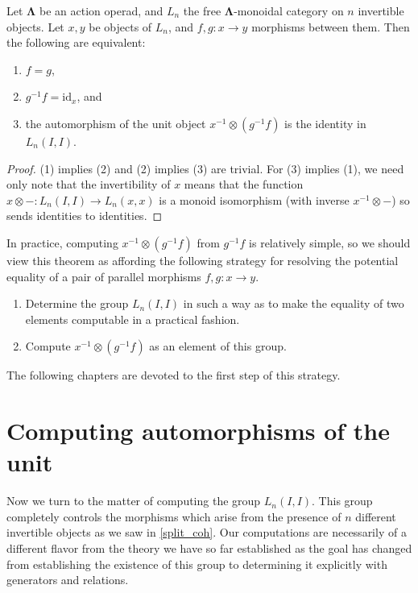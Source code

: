 \documentclass{amsbook} %
\newcommand{\id}{\textrm{id}}
\newcommand{\ML}{\mathbf{\Lambda}}
\numberwithin{section}{chapter}
\begin{document}
\begin{thm}\label{split_coh}
Let $\ML$ be an action operad, and $L_n$ the free $\ML$-monoidal category on $n$ invertible objects. Let $x, y$ be objects of $L_n$, and $f, g \colon  x \rightarrow y$ morphisms between them. Then the following are equivalent:
\begin{enumerate}
\item $f = g$,
\item $g^{-1} f = \id_x$, and
\item the automorphism of the unit object $x^{-1} \otimes \left(g^{-1} f\right)$ is the identity in $L_n(I,I)$.
\end{enumerate}
\end{thm}
\begin{proof}
(1) implies (2) and (2) implies (3) are trivial. For (3) implies (1), we need only note that the invertibility of $x$ means that the function $x \otimes - \colon L_n(I,I) \rightarrow L_n(x,x)$ is a monoid isomorphism (with inverse $x^{-1} \otimes -$) so sends identities to identities.
\end{proof}

In practice, computing $x^{-1} \otimes \left(g^{-1} f\right)$ from $g^{-1} f$ is relatively simple, so we should view this theorem as affording the following strategy for resolving the potential equality of a pair of parallel morphisms $f, g \colon x \rightarrow y$.
\begin{enumerate}
\item Determine the group $L_n(I,I)$ in such a way as to make the equality of two elements computable in a practical fashion.
\item Compute $x^{-1} \otimes \left(g^{-1} f\right)$ as an element of this group.
\end{enumerate}
The following chapters are devoted to the first step of this strategy.

\chapter{Computing automorphisms of the unit}

Now we turn to the matter of computing the group $L_n(I,I)$. This group completely controls the morphisms which arise from the presence of $n$ different invertible objects as we saw in \cref{split_coh}. Our computations are necessarily of a different flavor from the theory we have so far established as the goal has changed from establishing the existence of this group to determining it explicitly with generators and relations.
\end{document}
